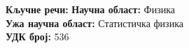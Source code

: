




\noindent
\textbf{Кључне речи:} %
\textbf{Научна област:} Физика \\
\textbf{Ужа научна област:} Статистичка физика \\
\textbf{УДК број:} 536 %


\pagebreak
